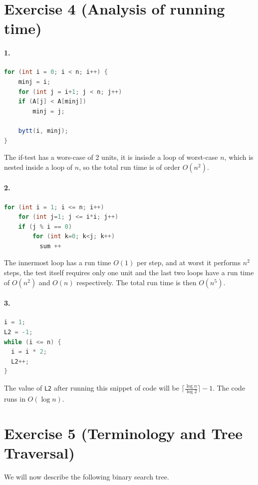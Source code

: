 \documentclass[a4paper, 11pt, notitlepage, english]{article}
\begin{document}
\clearpage

\section*{Exercise 4 (Analysis of running time)}

\paragraph{1.}
\begin{lstlisting}[language=java]
for (int i = 0; i < n; i++) {
    minj = i;
    for (int j = i+1; j < n; j++)
	if (A[j] < A[minj])
	    minj = j;

    bytt(i, minj);
}
\end{lstlisting}
The if-test has a wors-case of 2 units, it is insisde a loop of worst-case $n$, which is nested inside a loop of $n$, so the total run time is of order $O(n^2)$.

\paragraph{2.}
\begin{lstlisting}[language=java]
for (int i = 1; i <= n; i++)
    for (int j=1; j <= i*i; j++)
	if (j % i == 0) 
	    for (int k=0; k<j; k++)
	      sum ++
\end{lstlisting}
The innermost loop has a run time $O(1)$ per step, and at worst it performs $n^2$ steps, the test itself requires only one unit and the last two loops have a run time of $O(n^2)$ and $O(n)$ respectively. The total run time is then $O(n^5)$.

\paragraph{3.}
\begin{lstlisting}[language=java]
i = 1;
L2 = -1;
while (i <= n) {
  i = i * 2;
  L2++;
}
\end{lstlisting}
The value of \verb+L2+ after running this snippet of code will be $\lceil \frac{\log n}{\log 2} \rceil - 1$. The code runs in $O(\log n)$.

\clearpage

\section*{Exercise 5 (Terminology and Tree Traversal)}
We will now describe the following binary search tree.
\end{document}
